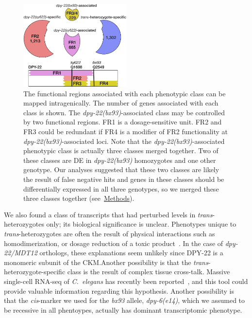 \documentclass[9pt,twocolumn,twoside]{gsajnl}
\newcommand{\cel}{\emph{C.~elegans}}
\newcommand{\gene}[1]{\mbox{\emph{#1}}}
\newcommand{\protein}[1]{\mbox{\uppercase{#1}}}
\newcommand{\dpy}[1]{\gene{dpy-22#1}}
\newcommand{\bx}{\dpy{(bx93)}}
\begin{document}
\begin{figure}
  \centering{}
  \includegraphics[width=0.5\textwidth]{../figs/inferred_domains.pdf}
  \caption{
          The functional regions associated with each phenotypic class can be
          mapped intragenically. The number of genes associated with each class
          is shown. The \bx{}-associated class may be controlled by two
          functional regions. FR1 is a dosage-sensitive unit. FR2 and FR3 could
          be redundant if FR4 is a modifier of FR2 functionality at
          \bx{}-associated loci. Note that the \bx{}-associated phenotypic class
          is actually three classes merged together. Two of these classes are DE
          in \bx{} homozygotes and one other genotype. Our analyses suggested
          that these two classes are likely the result of false negative hits
          and genes in these classes should be differentially expressed in all
          three genotypes, so we merged these three classes together
          (see~\hyperref[sec:methods]{Methods}). }
\label{fig:domains}
\end{figure}

We also found a class of transcripts that had perturbed levels in
\emph{trans}-heterozygotes only; its biological significance is unclear.
Phenotypes unique to \emph{trans}-heterozygotes are often the result of physical
interactions such as homodimerization, or dosage reduction of a toxic
product~\citep{Yook2005}. In the case of \dpy{/MDT12} orthologs, these
explanations seem unlikely since \protein{dpy-22} is a monomeric subunit of the
CKM.\@ Another possibility is that the \emph{trans}-heterozygote-specific class
is the result of complex tissue cross-talk. Massive single-cell RNA-seq of
\cel{} has recently been reported~\citep{Cao2017}, and this tool could provide
valuable information regarding this hypothesis. Another possibility is that the
\emph{cis}-marker we used for the \emph{bx93} allele, \gene{dpy-6(e14)}, which
we assumed to be recessive in all phentoypes, actually has dominant
transcriptomic phenotype.
\end{document}
